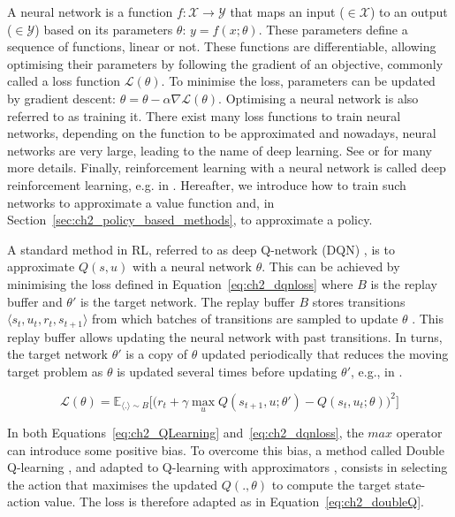 A neural network is a function $f: \mathcal{X} \rightarrow \mathcal{Y}$ that maps an input ($\in\mathcal{X}$) to an output ($\in\mathcal{Y}$) based on its parameters $\theta$: $y = f(x;\theta)$.
These parameters define a sequence of functions, linear or not.
These functions are differentiable, allowing optimising their parameters by following the gradient of an objective, commonly called a loss function $\mathcal{L}(\theta)$.
To minimise the loss, parameters can be updated by gradient descent: $\theta = \theta - \alpha \nabla \mathcal{L}(\theta)$.
Optimising a neural network is also referred to as training it.
There exist many loss functions to train neural networks, depending on the function to be approximated and nowadays, neural networks are very large, leading to the name of deep learning.
See \citep{zhang2023dive} or \citep{pml1Book} for many more details.
Finally, reinforcement learning with a neural network is called deep reinforcement learning, e.g. in \citep{introDeepRL}.
Hereafter, we introduce how to train such networks to approximate a value function and, in Section~\ref{sec:ch2_policy_based_methods}, to approximate a policy.

A standard method in RL, referred to as deep Q-network (DQN) \citep{Mnih2015}, is to approximate $Q(s, u)$ with a neural network $\theta$.
This can be achieved by minimising the loss defined in Equation~\ref{eq:ch2_dqnloss} where $B$ is the replay buffer and $\theta'$ is the target network.
The replay buffer $B$ stores transitions $\langle s_{t},u_{t},r_{t},s_{t+1}\rangle$ from which batches of transitions are sampled to update $\theta$ \citep{lin1992self}.
This replay buffer allows updating the neural network with past transitions.
In turns, the target network $\theta'$ is a copy of $\theta$ updated periodically that reduces the moving target problem as $\theta$ is updated several times before updating $\theta'$, e.g., in \citep{Mnih2015}.

\begin{equation}
\label{eq:ch2_dqnloss}
    \mathcal{L}(\theta) = \mathbb{E}_{\langle . \rangle\sim B} \big[\big(r_{t} + \gamma \max_u Q(s_{t+1}, u; \theta')- Q(s_{t}, u_{t}; \theta)\big)^{2}\big]
\end{equation}

In both Equations~\ref{eq:ch2_QLearning} and~\ref{eq:ch2_dqnloss}, the $max$ operator can introduce some positive bias. 
To overcome this bias, a method called Double Q-learning \citep{hasselt2010double}, and adapted to Q-learning with approximators \citep{van2016deep}, consists in selecting the action that maximises the updated $Q(., \theta)$ to compute the target state-action value.
The loss is therefore adapted as in Equation~\ref{eq:ch2_doubleQ}.

